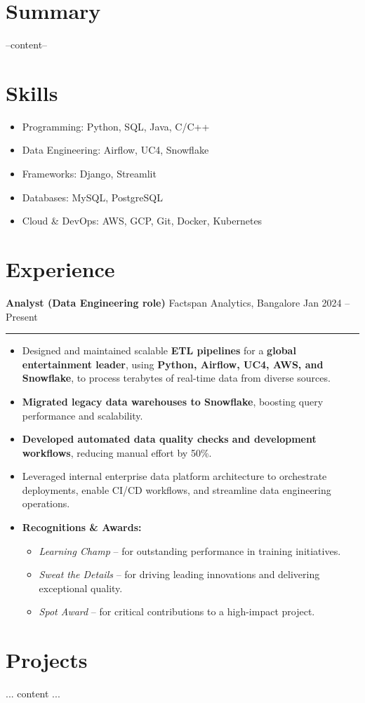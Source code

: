 \documentclass[a4paper,10pt]{article}
\begin{document}

\section*{Summary}
--content--
\section*{Skills}
\begin{itemize}
    \item Programming: Python, SQL, Java, C/C++
    \item Data Engineering: Airflow, UC4, Snowflake
    \item Frameworks: Django, Streamlit
    \item Databases: MySQL, PostgreSQL
    \item Cloud \& DevOps: AWS, GCP, Git, Docker, Kubernetes
\end{itemize}

\section*{Experience}
\textbf{Analyst (Data Engineering role)} \hfill Factspan Analytics, Bangalore \hfill Jan 2024 – Present\vspace{0.2cm}
\hrule
\vspace{0.2cm}
\begin{itemize}
    \item Designed and maintained scalable \textbf{ETL pipelines} for a \textbf{global entertainment leader}, using \textbf{Python, Airflow, UC4, AWS, and Snowflake}, to process terabytes of real-time data from diverse sources.
    \item \textbf{Migrated legacy data warehouses to Snowflake}, boosting query performance and scalability.
    \item \textbf{Developed automated data quality checks and development workflows}, reducing manual effort by 50\%.
    \item Leveraged internal enterprise data platform architecture to orchestrate deployments, enable CI/CD workflows, and streamline data engineering operations.
    \item \textbf{Recognitions \& Awards:}
    \begin{itemize}
        \item \textit{Learning Champ} – for outstanding performance in training initiatives.
        \item \textit{Sweat the Details} – for driving leading innovations and delivering exceptional quality.
        \item \textit{Spot Award} – for critical contributions to a high-impact project.
    \end{itemize}
\end{itemize}

\section*{Projects}
... content ...


\end{document}
